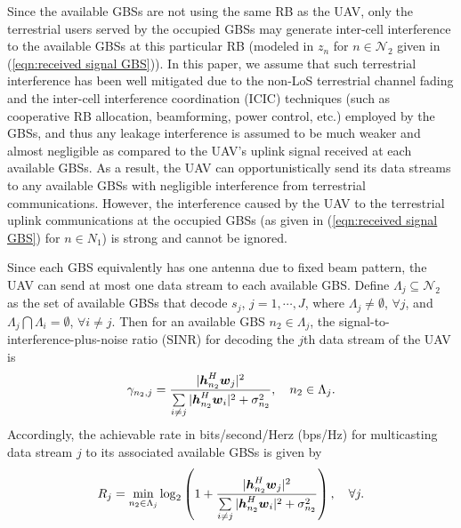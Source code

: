 \documentclass[onecolumn, draftclsnofoot, 12pt]{IEEEtran}
\newcommand{\mv}[1]{\mbox{\boldmath{$ #1 $}}}
\begin{document}
Since the available GBSs are not using the same RB as the UAV, only the terrestrial users served by the occupied GBSs may generate inter-cell interference to the available GBSs at this particular RB (modeled in $z_n$ for $n\in \mathcal{N}_2$ given in (\ref{eqn:received signal GBS})). In this paper, we assume that such terrestrial interference has been well mitigated due to the non-LoS terrestrial channel fading and the inter-cell interference coordination (ICIC) techniques (such as cooperative RB allocation, beamforming, power control, etc.) employed by the GBSs, and thus any leakage interference is assumed to be much weaker and almost negligible as compared to the UAV's uplink signal received at each available GBSs. As a result, the UAV can opportunistically send its data streams to any available GBSs with negligible interference from terrestrial communications. However, the interference caused by the UAV to the terrestrial uplink communications at the occupied GBSs (as given in (\ref{eqn:received signal GBS}) for $n\in N_1$) is strong and cannot be ignored.

Since each GBS equivalently has one antenna due to fixed beam pattern, the UAV can send at most one data stream to each available GBS. Define $\Lambda_j\subseteq \mathcal{N}_2$ as the set of available GBSs that decode $s_j$, $j=1,\cdots,J$, where $\Lambda_j\neq \emptyset$, $\forall j$, and $\Lambda_j\bigcap \Lambda_i=\emptyset$, $\forall i\neq j$. Then for an available GBS $n_2\in \Lambda_j$, the signal-to-interference-plus-noise ratio (SINR) for decoding the $j$th data stream of the UAV is
\begin{align}\label{eqn:SINR}
\gamma_{n_2,j}=\frac{|\mv{h}_{n_2}^H\mv{w}_j|^2}{\sum\limits_{i\neq j}|\mv{h}_{n_2}^H\mv{w}_i|^2+\sigma_{n_2}^2}, ~~~ n_2\in \Lambda_j.
\end{align}Accordingly, the achievable rate in bits/second/Herz (bps/Hz) for multicasting data stream $j$ to its associated available GBSs is given by
\begin{align}\label{eqn:rate}
R_j=\min\limits_{n_2\in \Lambda_j} \log_2\left(1+\frac{|\mv{h}_{n_2}^H\mv{w}_j|^2}{\sum\limits_{i\neq j}|\mv{h}_{n_2}^H\mv{w}_i|^2+\sigma_{n_2}^2}\right), ~~~ \forall j.
\end{align}
\end{document}
